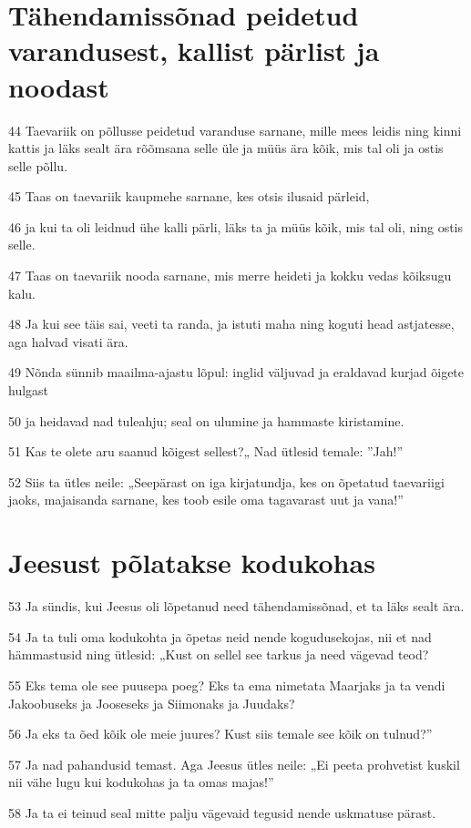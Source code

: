 \section*{Tähendamissõnad peidetud varandusest, kallist pärlist ja noodast}

\par 44 Taevariik on põllusse peidetud varanduse sarnane, mille mees leidis ning kinni kattis ja läks sealt ära rõõmsana selle üle ja müüs ära kõik, mis tal oli ja ostis selle põllu.
\par 45 Taas on taevariik kaupmehe sarnane, kes otsis ilusaid pärleid,
\par 46 ja kui ta oli leidnud ühe kalli pärli, läks ta ja müüs kõik, mis tal oli, ning ostis selle.
\par 47 Taas on taevariik nooda sarnane, mis merre heideti ja kokku vedas kõiksugu kalu.
\par 48 Ja kui see täis sai, veeti ta randa, ja istuti maha ning koguti head astjatesse, aga halvad visati ära.
\par 49 Nõnda sünnib maailma-ajastu lõpul: inglid väljuvad ja eraldavad kurjad õigete hulgast
\par 50 ja heidavad nad tuleahju; seal on ulumine ja hammaste kiristamine.
\par 51 Kas te olete aru saanud kõigest sellest?„ Nad ütlesid temale: ”Jah!”
\par 52 Siis ta ütles neile: „Seepärast on iga kirjatundja, kes on õpetatud taevariigi jaoks, majaisanda sarnane, kes toob esile oma tagavarast uut ja vana!”

\section*{Jeesust põlatakse kodukohas}

\par 53 Ja sündis, kui Jeesus oli lõpetanud need tähendamissõnad, et ta läks sealt ära.
\par 54 Ja ta tuli oma kodukohta ja õpetas neid nende kogudusekojas, nii et nad hämmastusid ning ütlesid: „Kust on sellel see tarkus ja need vägevad teod?
\par 55 Eks tema ole see puusepa poeg? Eks ta ema nimetata Maarjaks ja ta vendi Jakoobuseks ja Jooseseks ja Siimonaks ja Juudaks?
\par 56 Ja eks ta õed kõik ole meie juures? Kust siis temale see kõik on tulnud?”
\par 57 Ja nad pahandusid temast. Aga Jeesus ütles neile: „Ei peeta prohvetist kuskil nii vähe lugu kui kodukohas ja ta omas majas!”
\par 58 Ja ta ei teinud seal mitte palju vägevaid tegusid nende uskmatuse pärast.


